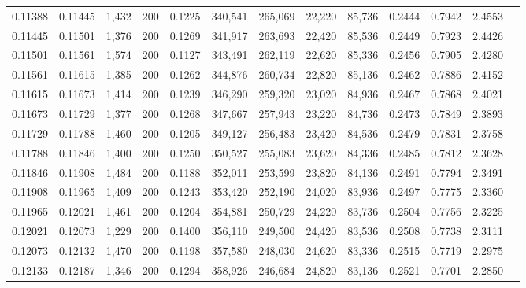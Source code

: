 \begin{tabular}{rrrrrrrrrrrrr}
0.11388 & 0.11445 &  1,432 & 200 &                                     0.1225 & 340,541 & 265,069 &  22,220 &  85,736 & 0.2444 & 0.7942 & 2.4553 \\
0.11445 & 0.11501 &  1,376 & 200 &                                     0.1269 & 341,917 & 263,693 &  22,420 &  85,536 & 0.2449 & 0.7923 & 2.4426 \\
0.11501 & 0.11561 &  1,574 & 200 &                                     0.1127 & 343,491 & 262,119 &  22,620 &  85,336 & 0.2456 & 0.7905 & 2.4280 \\
0.11561 & 0.11615 &  1,385 & 200 &                                     0.1262 & 344,876 & 260,734 &  22,820 &  85,136 & 0.2462 & 0.7886 & 2.4152 \\
0.11615 & 0.11673 &  1,414 & 200 &                                     0.1239 & 346,290 & 259,320 &  23,020 &  84,936 & 0.2467 & 0.7868 & 2.4021 \\
0.11673 & 0.11729 &  1,377 & 200 &                                     0.1268 & 347,667 & 257,943 &  23,220 &  84,736 & 0.2473 & 0.7849 & 2.3893 \\
0.11729 & 0.11788 &  1,460 & 200 &                                     0.1205 & 349,127 & 256,483 &  23,420 &  84,536 & 0.2479 & 0.7831 & 2.3758 \\
0.11788 & 0.11846 &  1,400 & 200 &                                     0.1250 & 350,527 & 255,083 &  23,620 &  84,336 & 0.2485 & 0.7812 & 2.3628 \\
0.11846 & 0.11908 &  1,484 & 200 &                                     0.1188 & 352,011 & 253,599 &  23,820 &  84,136 & 0.2491 & 0.7794 & 2.3491 \\
0.11908 & 0.11965 &  1,409 & 200 &                                     0.1243 & 353,420 & 252,190 &  24,020 &  83,936 & 0.2497 & 0.7775 & 2.3360 \\
0.11965 & 0.12021 &  1,461 & 200 &                                     0.1204 & 354,881 & 250,729 &  24,220 &  83,736 & 0.2504 & 0.7756 & 2.3225 \\
0.12021 & 0.12073 &  1,229 & 200 &                                     0.1400 & 356,110 & 249,500 &  24,420 &  83,536 & 0.2508 & 0.7738 & 2.3111 \\
0.12073 & 0.12132 &  1,470 & 200 &                                     0.1198 & 357,580 & 248,030 &  24,620 &  83,336 & 0.2515 & 0.7719 & 2.2975 \\
0.12133 & 0.12187 &  1,346 & 200 &                                     0.1294 & 358,926 & 246,684 &  24,820 &  83,136 & 0.2521 & 0.7701 & 2.2850 \\

\end{tabular}
